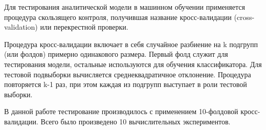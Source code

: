 Для тестирования аналитической модели в машинном обучении применяется процедура скользящего
контроля, получившая название кросс-валидации (cross-validation) или перекрестной проверки.~\cite{crossval}

Процедура кросс-валидации включает в себя случайное разбиение на k подгрупп (или фолдов) примерно
одинакового размера. Первый фолд служит для тестирования модели, остальные используются для обучения
классификатора. Для тестовой подвыборки вычисляется среднеквадратичное отклонение. Процедура повторяется k-1
раз, при этом каждая из подгрупп выступает в роли тестовой выборки.

В данной работе тестирование производилось с применением 10-фолдовой кросс-валидации. Всего было произведено
10 вычислительных экспериментов.